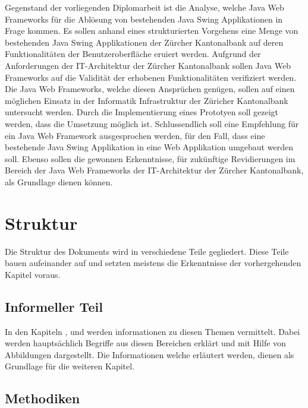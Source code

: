   Gegenstand der vorliegenden Diplomarbeit ist die Analyse, welche Java Web
  Frameworks für die Ablösung von bestehenden Java Swing Applikationen in Frage
  kommen. Es sollen anhand eines strukturierten Vorgehens eine Menge von
  bestehenden Java Swing Applikationen der Zürcher Kantonalbank auf deren
  Funktionalitäten der Benutzeroberfläche eruiert werden. Aufgrund der
  Anforderungen der IT-Architektur der Zürcher Kantonalbank sollen Java Web
  Frameworks auf die Validität der erhobenen Funktionalitäten verifiziert
  werden. Die Java Web Frameworks, welche diesen Ansprüchen genügen, sollen auf
  einen möglichen Einsatz in der Informatik Infrastruktur der Züricher
  Kantonalbank untersucht werden. Durch die Implementierung eines Prototyen
  soll gezeigt werden, dass die Umsetzung möglich ist. Schlussendlich soll eine
  Empfehlung für ein Java Web Framework ausgesprochen werden, für den Fall,
  dass eine bestehende Java Swing Applikation in eine Web Applikation umgebaut
  werden soll. Ebenso sollen die gewonnen Erkenntnisse, für zukünftige
  Revidierungen im Bereich der Java Web Frameworks der IT-Architektur der
  Zürcher Kantonalbank, als Grundlage dienen können.
  
  \section{Struktur}
  
  Die Struktur des Dokuments wird in verschiedene Teile gegliedert. Diese Teile
  bauen aufeinander auf und setzten meistens die Erkenntnisse der vorhergehenden
  Kapitel voraus.
  
  \subsection{Informeller Teil}
  
  In den Kapiteln 
  , 
   und
   werden informationen
  zu diesen Themen vermittelt. Dabei werden hauptsächlich Begriffe aus diesen
  Bereichen erklärt und mit Hilfe von Abbildungen dargestellt. Die
  Informationen welche erläutert werden, dienen als Grundlage für die weiteren
  Kapitel.
  
  \subsection{Methodiken}
  

